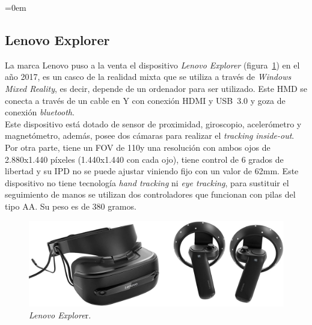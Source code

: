 \parindent=0em
\subsection{Lenovo Explorer}
\noindent

La marca Lenovo puso a la venta el dispositivo \textit{Lenovo Explorer} (figura~\ref{fig:lenovoExplorer}) en el año 2017, es un casco de la realidad mixta que se utiliza a través de \textit{Windows Mixed Reality}, es decir, depende de un ordenador para ser utilizado. Este HMD se conecta a través de un cable en Y con conexión HDMI y USB~3.0 y goza de conexión \textit{bluetooth}.\\

Este dispositivo está dotado de sensor de proximidad, giroscopio, acelerómetro y magnetómetro, además, posee dos cámaras para realizar el \textit{tracking} \textit{inside-out}.\\

Por otra parte, tiene un FOV de 110\degree  y una resolución con ambos ojos de 2.880x1.440 píxeles (1.440x1.440 con cada ojo), tiene control de 6 grados de libertad  y su IPD no se puede ajustar viniendo fijo con un valor de 62mm. Este dispositivo no tiene tecnología \textit{hand tracking} ni \textit{eye tracking}, para sustituir el seguimiento de manos se utilizan dos controladores que funcionan con pilas del tipo AA. Su peso es de 380 gramos. 



\begin{figure}[H]
    \centering
    \includegraphics[scale=0.2]{Images/Estado del arte/lenovoexplorer.jpg}
    \caption[Lenovo Explore]{\textit{Lenovo Explore}r\footnotemark.}
    \label{fig:lenovoExplorer}
\end{figure}

